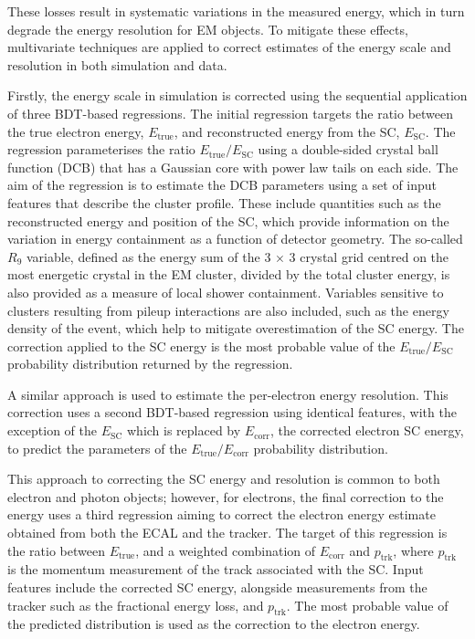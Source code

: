 \noindent These losses result in systematic variations in the measured energy, which in turn degrade the energy resolution for EM objects. To mitigate these effects, multivariate techniques are applied to correct estimates of the energy scale and resolution in both simulation and data.    

Firstly, the energy scale in simulation is corrected using the sequential application of three BDT-based regressions. The initial regression targets the ratio between the true electron energy, $E_{\mathrm{true}}$, and reconstructed energy from the SC, $E_{\mathrm{SC}}$. The regression parameterises the ratio $E_{\mathrm{true}}/E_{\mathrm{SC}}$ using a double-sided crystal ball function (DCB) that has a Gaussian core with power law tails on each side. The aim of the regression is to estimate the DCB parameters using a set of input features that describe the cluster profile. These include quantities such as the reconstructed energy and position of the SC, which provide information on the variation in energy containment as a function of detector geometry.
The so-called $R_{9}$ variable, defined as the energy sum of the 3 $\times$ 3 crystal grid centred on the most energetic crystal in the EM cluster, divided by the total cluster energy, is also provided as a measure of local shower containment.
Variables sensitive to clusters resulting from pileup interactions are also included, such as the energy density of the event, which help to mitigate overestimation of the SC energy. 
The correction applied to the SC energy is the most probable value of the $E_{\mathrm{true}}/E_{\mathrm{SC}}$ probability distribution returned by the regression.

A similar approach is used to estimate the per-electron energy resolution. This correction uses a second BDT-based regression using identical features, with the exception of the $E_{\mathrm{SC}}$ which is replaced by $E_{\mathrm{corr}}$, the corrected electron SC energy, to predict the parameters of the $E_{\mathrm{true}}/E_{\mathrm{corr}}$ probability distribution. 

This approach to correcting the SC energy and resolution is common to both electron and photon objects; however, for electrons, the final correction to the energy uses a third regression aiming to correct the electron energy estimate obtained from both the ECAL and the tracker. The target of this regression is the ratio between $E_{\mathrm{true}}$, and a weighted combination of $E_{\mathrm{corr}}$ and $p_{\mathrm{trk}}$, where $p_{\mathrm{trk}}$ is the momentum measurement of the track associated with the SC. Input features include the corrected SC energy, alongside measurements from the tracker such as the fractional energy loss, and $p_{\mathrm{trk}}$. The most probable value of the predicted distribution is used as the correction to the electron energy.

